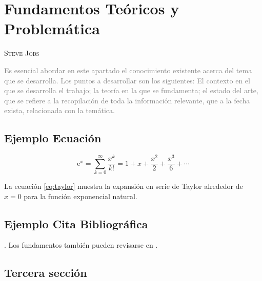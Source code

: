 \chapter{Fundamentos Teóricos y Problemática}
              {\textsc{Steve Jobs}}
              
\textcolor{gray}{Es esencial abordar en este apartado el conocimiento existente acerca del tema que se desarrolla. Los puntos a desarrollar son los siguientes: El contexto en el que se desarrolla el trabajo; la teoría en la que se fundamenta; el estado del arte, que se refiere a la recopilación de toda la información relevante, que a la fecha exista, relacionada con la temática. }

\section{Ejemplo Ecuación}

\lipsum[1]

\begin{equation}                                                     
\mathrm{e}^{x} = \sum_{k=0}^{\infty} \frac{x^k}{k!} = 
1 + x + \frac{x^2}{2} + \frac{x^3}{6} + \cdots
\label{eq:taylor}
\end{equation}

La ecuación \eqref{eq:taylor} muestra la expansión en serie de Taylor alrededor de $x = 0$ para la función exponencial natural.

\section{Ejemplo Cita Bibliográfica}
\lipsum[3-4].  
Los fundamentos también pueden revisarse en \cite{knuth97}. 

\section{Tercera sección}
\lipsum[5-6]

